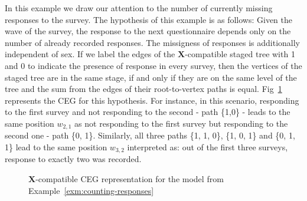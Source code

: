 \documentclass[runningheads]{llncs}
\begin{document}
\begin{example}
\label{exm:counting-responses}
In this example we draw our attention to the number of currently missing responses to the survey. The hypothesis of this example is as follows: Given the wave of the survey, the response to the next questionnaire depends only on the number of already recorded responses. The missigness of responses is additionally independent of sex. 
If we label the edges of the $\boldsymbol{X}$-compatible staged tree with 1 and 0 to indicate the presence of response in every survey, then the vertices of the staged tree are in the same stage, if and only if they are on the same level of the tree and the sum from the edges of their root-to-vertex paths is equal. Fig~\ref{ceg:counting-responses} represents the CEG for this hypothesis. For instance, in this scenario, responding to the first survey and not responding to the second - path \{1,0\} - leads to the same position $w_{2,1}$ as not responding to the first survey but responding to the second one - path \{0, 1\}. Similarly, all three paths \{1, 1, 0\}, \{1, 0, 1\} and \{0, 1, 1\} lead to the same position $w_{3,2}$ interpreted as: out of the first three surveys, response to exactly two was recorded.
\end{example}
\begin{figure}
\centering

\vspace{1ex}
\caption{$\boldsymbol{X}$-compatible CEG representation for the  model from Example~\ref{exm:counting-responses}}
\label{ceg:counting-responses}
\end{figure}
\end{document}
